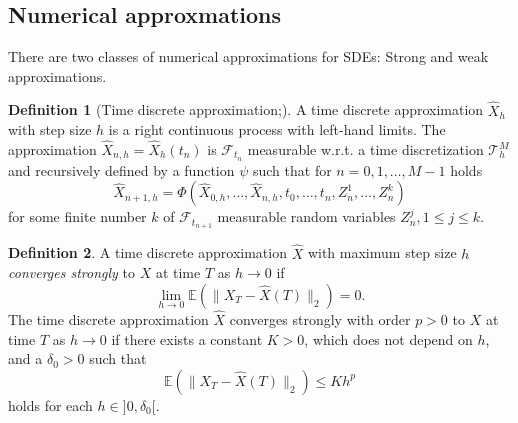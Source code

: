 \documentclass[12pt]{article}
\theoremstyle{definition}
\newtheorem{definition}[definition]{Definition}
\numberwithin{equation}{section}
\newcommand{\norm}[1]{\lVert{#1}\rVert_2}
\begin{document}
\subsection{Numerical approxmations}
\label{subsec:SdeNumericalMethods}
There are two classes of numerical approximations for SDEs: Strong and weak approximations. 
\begin{definition}[Time discrete approximation;]
  A time discrete approximation $\widehat{X}_h$ with step size $h$ is a right continuous process with left-hand limits. The approximation $\widehat{X}_{n,h} = \widehat{X}_h(t_n)$ is $\mathcal{F}_{t_n}$ measurable w.r.t. a time discretization $\mathcal{T}^M_h$ and recursively defined by a function $\psi$ such that for $n=0,1,\dots,M-1$ holds
  \begin{equation}
    \widehat{X}_{n+1, h} = \Phi(\widehat{X}_{0,h}, \dots, \widehat{X}_{n,h}, t_0, \dots, t_n, Z^1_n,\dots, Z_n^k)
  \end{equation}
  for some finite number $k$ of $\mathcal{F}_{t_{n+1}}$ measurable random variables $Z^j_n, 1 \leq j \leq k$.
\end{definition}
\begin{definition}
  A time discrete approximation $\widehat{X}$ with maximum step size $h$ \emph{converges strongly} to $X$ at time $T$ as $h \rightarrow 0$ if 
  \begin{equation}
    \lim_{h \rightarrow 0} \mathbb{E}(\norm{X_T - \widehat{X}(T)}) = 0.
  \end{equation}
  The time discrete approximation $\widehat{X}$ converges strongly with order $p>0$ to $X$ at time $T$ as $h \rightarrow 0$ if there exists a constant $K > 0$, which does not depend on $h$, and a $\delta_0 > 0$ such that 
  \begin{equation}
    \mathbb{E}(\norm{X_T - \widehat{X}(T)}) \leq K h^p
  \end{equation}
  holds for each $h \in ]0, \delta_0[$.
\end{definition}
\end{document}
